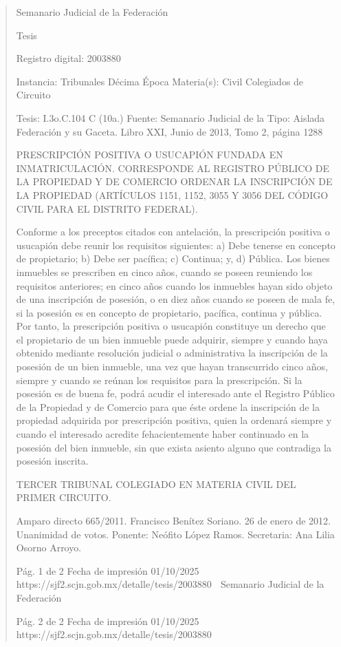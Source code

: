 \documentclass[11pt,a4paper]{article}
\begin{document}
\begin{quote}
                                                   Semanario Judicial de la Federación

                                                Tesis

 Registro digital: 2003880

 Instancia: Tribunales             Décima Época                           Materia(s): Civil
 Colegiados de Circuito

 Tesis: I.3o.C.104 C (10a.)        Fuente: Semanario Judicial de la       Tipo: Aislada
                                   Federación y su Gaceta.
                                   Libro XXI, Junio de 2013, Tomo 2,
                                   página 1288


PRESCRIPCIÓN POSITIVA O USUCAPIÓN FUNDADA EN INMATRICULACIÓN. CORRESPONDE
AL REGISTRO PÚBLICO DE LA PROPIEDAD Y DE COMERCIO ORDENAR LA INSCRIPCIÓN DE
LA PROPIEDAD (ARTÍCULOS 1151, 1152, 3055 Y 3056 DEL CÓDIGO CIVIL PARA EL DISTRITO
FEDERAL).


Conforme a los preceptos citados con antelación, la prescripción positiva o usucapión debe reunir
los requisitos siguientes: a) Debe tenerse en concepto de propietario; b) Debe ser pacífica; c)
Continua; y, d) Pública. Los bienes inmuebles se prescriben en cinco años, cuando se poseen
reuniendo los requisitos anteriores; en cinco años cuando los inmuebles hayan sido objeto de una
inscripción de posesión, o en diez años cuando se poseen de mala fe, si la posesión es en concepto
de propietario, pacífica, continua y pública. Por tanto, la prescripción positiva o usucapión constituye
un derecho que el propietario de un bien inmueble puede adquirir, siempre y cuando haya obtenido
mediante resolución judicial o administrativa la inscripción de la posesión de un bien inmueble, una
vez que hayan transcurrido cinco años, siempre y cuando se reúnan los requisitos para la
prescripción. Si la posesión es de buena fe, podrá acudir el interesado ante el Registro Público de la
Propiedad y de Comercio para que éste ordene la inscripción de la propiedad adquirida por
prescripción positiva, quien la ordenará siempre y cuando el interesado acredite fehacientemente
haber continuado en la posesión del bien inmueble, sin que exista asiento alguno que contradiga la
posesión inscrita.

TERCER TRIBUNAL COLEGIADO EN MATERIA CIVIL DEL PRIMER CIRCUITO.


Amparo directo 665/2011. Francisco Benítez Soriano. 26 de enero de 2012. Unanimidad de votos.
Ponente: Neófito López Ramos. Secretaria: Ana Lilia Osorno Arroyo.




                                              Pág. 1 de 2              Fecha de impresión 01/10/2025
  https://sjf2.scjn.gob.mx/detalle/tesis/2003880
                                                 Semanario Judicial de la Federación




                                            Pág. 2 de 2       Fecha de impresión 01/10/2025
https://sjf2.scjn.gob.mx/detalle/tesis/2003880

\end{quote}
\end{document}
